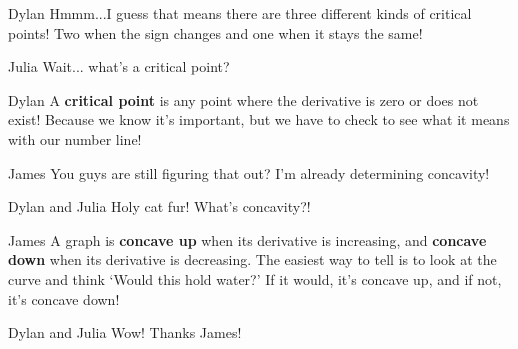 \documentclass{ximera}
\begin{document}
\begin{dialogue}
\item[Dylan] Hmmm...I guess that means there are three different kinds of critical points! Two when the sign changes and one when it stays the same!
\item[Julia] Wait... what's a critical point?
\item[Dylan] A \textbf{critical point} is any point where the derivative is zero or does not exist! Because we know it's important, but we have to check to see what it means with our number line!

\item[James] You guys are still figuring that out? I'm already determining concavity!
\item[Dylan and Julia] Holy cat fur! What's concavity?!
\item[James] A graph is \textbf{concave up} when its derivative is increasing, and \textbf{concave down} when its derivative is decreasing. The easiest way to tell is to look at the curve and think `Would this hold water?' If it would, it's concave up, and if not, it's concave down!
\item[Dylan and Julia] Wow! Thanks James!
\end{dialogue}
\end{document}
